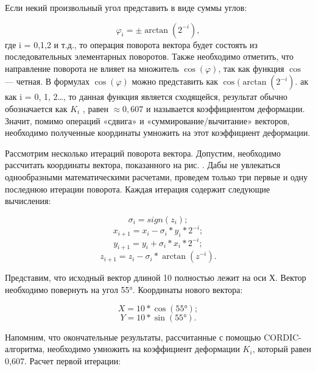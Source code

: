 \documentclass[a4paper,oneside ,14pt]{extreport}
\begin{document}
Если некий произвольный угол представить в виде суммы углов:

\begin{displaymath}	
\varphi_i = \pm\arctan(2^{-i}), 
\end{displaymath}
где i = 0,1,2 и т.д., то операция поворота вектора будет состоять
из последовательных элементарных поворотов. Также необходимо отметить, что направление поворота не влияет на множитель \(\cos(\varphi)\),
так как функция \(\cos\) — четная. В формулах \(\cos(\varphi)\) можно представить как \(\cos(\arctan(2^{-i})\). ак как i = 0, 1, 2…, то данная функция является сходящейся, результат обычно обозначается как \(K_i\)
, равен \(\approx0,607\) и называется коэффициентом деформации. Значит, помимо 
операций «сдвига» и «суммирование/вычитание» векторов, необходимо полученные 
координаты умножить на этот коэффициент 
деформации.

Рассмотрим несколько итераций поворота вектора. Допустим, необходимо рассчитать координаты вектора, показанного на рис. . Дабы не увлекаться однообразными математическими расчетами, проведем только три первые и одну последнюю итерации поворота. Каждая итерация содержит следующие вычисления:

\begin{displaymath}	
\sigma_i = sign(z_i);
\end{displaymath}
\begin{displaymath}	
x_{i+1} = x_{i} - \sigma_i*y_i*2^{-i};
\end{displaymath}
\begin{displaymath}
y_{i+1} = y_{i} + \sigma_i*x_i*2^{-i};
\end{displaymath}
\begin{displaymath}	
z_{i+1} = z_{i} - \sigma_i*\arctan(z^{-i}).
\end{displaymath}

Представим, что исходный вектор длиной 10 полностью лежит на оси Х. 
Вектор необходимо повернуть на угол 55°. Координаты нового вектора:

\begin{displaymath}
X = 10*\cos(55°);
\end{displaymath}
\begin{displaymath}	
Y = 10*\sin(55°).
\end{displaymath}

Напомним, что окончательные результаты, рассчитанные с помощью CORDIC-алгоритма, необходимо умножить на коэффициент 
деформации \(K_i\), который равен 0,607. Расчет первой итерации:
\end{document}

